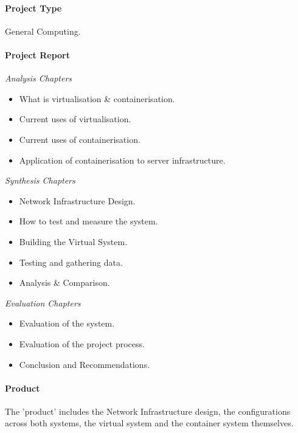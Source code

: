 \paragraph{Project Type} General Computing.

\paragraph{Project Report}
\emph{Analysis Chapters}
\begin{itemize}
	\item What is virtualisation \& containerisation.
	\item Current uses of virtualisation.
	\item Current uses of containerisation.
	\item Application of containerisation to server infrastructure.
\end{itemize}

\emph{Synthesis Chapters}
\begin{itemize}
	\item Network Infrastructure Design.
	\item How to test and measure the system.
	\item Building the Virtual System.
	\item Testing and gathering data.
	\item Analysis \& Comparison.
\end{itemize}

\emph{Evaluation Chapters}
\begin{itemize}
	\item Evaluation of the system.
	\item Evaluation of the project process.
	\item Conclusion and Recommendations.
\end{itemize}

\paragraph{Product} The 'product' includes the Network Infrastructure design, the configurations across both systems, the virtual system and the container system themselves.



